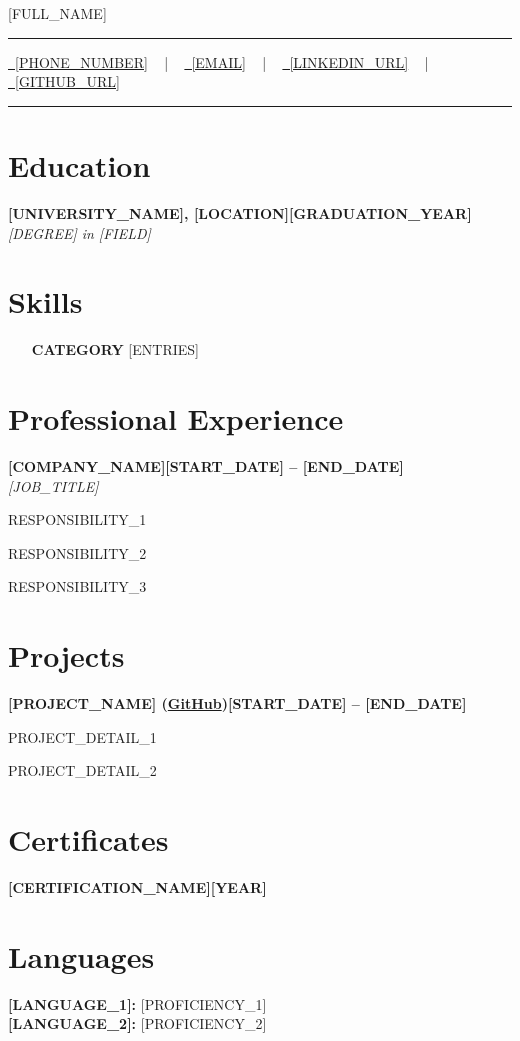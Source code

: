 \documentclass[letterpaper,10pt]{article}
\newcommand{\documentTitle}[2]{
  \begin{center}
    {\Huge\color{accentTitle} #1}
    \vspace{10pt}
    {\color{accentLine} \hrule}
    \vspace{2pt}
    \footnotesize{#2}
    \vspace{2pt}
    {\color{accentLine} \hrule}
  \end{center}
}
\newcommand{\heading}[2]{
  \hspace{10pt}#1\hfill#2\\
}
\newcommand{\headingBf}[2]{
  \heading{\textbf{#1}}{\textbf{#2}}
}
\newcommand{\headingIt}[2]{
  \heading{\textit{#1}}{\textit{#2}}
}
\newenvironment{resume_list}{
  \vspace{-7pt}
  \begin{itemize}[itemsep=-2px, parsep=1pt, leftmargin=30pt]
}{
  \end{itemize}
}
\begin{document}
\documentTitle{[FULL_NAME]}{
    \href{tel:[PHONE_NUMBER]}{
      \raisebox{-0.05\height} \faPhone\ [PHONE_NUMBER]} ~ | ~
    \href{mailto:[EMAIL]}{
      \raisebox{-0.15\height} \faEnvelope\ [EMAIL]} ~ | ~
    \href{[LINKEDIN_URL]}{
      \raisebox{-0.15\height} \faLinkedin\ [LINKEDIN_URL]} ~ | ~
    \href{[GITHUB_URL]}{
      \raisebox{-0.15\height} \faGithub\ [GITHUB_URL]}
}

\section{Education}
\headingBf{[UNIVERSITY_NAME], [LOCATION]}{[GRADUATION_YEAR]}
\headingIt{[DEGREE] in [FIELD]}{}

\section{Skills}
\begin{multicols}{2}
\begin{itemize}[itemsep=-2px, parsep=1pt, leftmargin=75pt]
    \item[\textbf{CATEGORY}] [ENTRIES]
\end{itemize}
\end{multicols}

\section{Professional Experience}
\headingBf{[COMPANY_NAME]}{[START_DATE] -- [END_DATE]}
\headingIt{[JOB_TITLE]}{}
\begin{resume_list}
    \item [RESPONSIBILITY_1]
    \item [RESPONSIBILITY_2]
    \item [RESPONSIBILITY_3]
\end{resume_list}

\section{Projects}
\headingBf{[PROJECT_NAME] (\href{[PROJECT_LINK]}{GitHub})}{[START_DATE] -- [END_DATE]}
\begin{resume_list}
    \item [PROJECT_DETAIL_1]
    \item [PROJECT_DETAIL_2]
\end{resume_list}

\section{Certificates}
\headingBf{[CERTIFICATION_NAME]}{[YEAR]}

\section{Languages}
\textbf{[LANGUAGE_1]:} [PROFICIENCY_1] \\
\textbf{[LANGUAGE_2]:} [PROFICIENCY_2]
\end{document}
